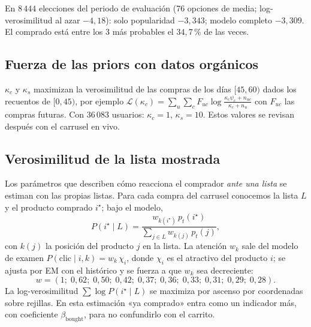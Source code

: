 \documentclass[11pt,a4paper]{article}
\begin{document}
En $8\,444$ elecciones del periodo de evaluación (76 opciones de media; log-verosimilitud al azar
$-4{,}18$): solo popularidad $-3{,}343$; modelo completo $-3{,}309$. El comprado está entre los 3 más
probables el $34{,}7$\,\% de las veces.

\subsection{Fuerza de las priors con datos orgánicos}

$\kappa_c$ y $\kappa_s$ maximizan la verosimilitud de las compras de los días $[45,60)$ dados los
recuentos de $[0,45)$, por ejemplo
$\mathcal L(\kappa_c)=\sum_u\sum_c F_{uc}\log\frac{\kappa_c\psi_c+n_{uc}}{\kappa_c+n_u}$ con $F_{uc}$ las compras
futuras. Con $36\,083$ usuarios: $\kappa_c=1$, $\kappa_s=10$. Estos valores se revisan después con el
carrusel en vivo.

\subsection{Verosimilitud de la lista mostrada}\label{sec:lista}

Los parámetros que describen cómo reacciona el comprador \emph{ante una lista} se estiman con las
propias listas. Para cada compra del carrusel conocemos la lista $L$ y el producto comprado $i^\star$; bajo
el modelo,
\begin{equation}
P(i^\star\mid L)=\frac{w_{k(i^\star)}\,p_t(i^\star)}{\sum_{j\in L}w_{k(j)}\,p_t(j)}, \label{eq:lista}
\end{equation}
con $k(j)$ la posición del producto $j$ en la lista. La atención $w_k$ sale del modelo de examen
$P(\text{clic}\mid i,k)=w_k\,\chi_i$, donde $\chi_i$ es el atractivo del producto $i$; se ajusta por EM con
el histórico y se fuerza a que $w_k$ sea decreciente:
\[
w=(1;\;0{,}62;\;0{,}50;\;0{,}42;\;0{,}37;\;0{,}36;\;0{,}33;\;0{,}31;\;0{,}29;\;0{,}28).
\]
La log-verosimilitud
$\sum\log P(i^\star\mid L)$ se maximiza por ascenso por coordenadas sobre rejillas. En esta estimación «ya
comprado» entra como un indicador más, con coeficiente $\beta_{\text{bought}}$, para no confundirlo
con el carrito.
\end{document}
